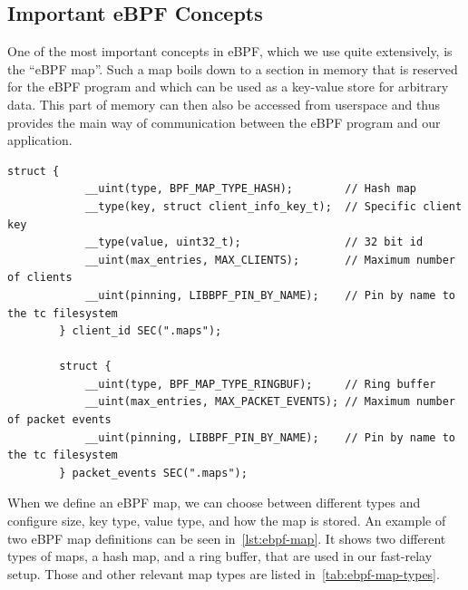 \subsection{Important eBPF Concepts}
One of the most important concepts in eBPF, which we use quite extensively, is 
the ``eBPF map''.
Such a map boils down to a section in memory that is reserved for the eBPF program
and which can be used as a key-value store for arbitrary data.
This part of memory can then also be accessed from userspace and thus provides the main 
way of communication between the eBPF program and our application.


\vspace{0.5cm}
\noindent\begin{minipage}{\textwidth}
    \begin{lstlisting}[style=CStyle,caption={Examplary eBPF map definitions.}, label={lst:ebpf-map}]
        struct {
            __uint(type, BPF_MAP_TYPE_HASH);        // Hash map
            __type(key, struct client_info_key_t);  // Specific client key
            __type(value, uint32_t);                // 32 bit id
            __uint(max_entries, MAX_CLIENTS);       // Maximum number of clients
            __uint(pinning, LIBBPF_PIN_BY_NAME);    // Pin by name to the tc filesystem
        } client_id SEC(".maps");

        struct {
            __uint(type, BPF_MAP_TYPE_RINGBUF);     // Ring buffer
            __uint(max_entries, MAX_PACKET_EVENTS); // Maximum number of packet events
            __uint(pinning, LIBBPF_PIN_BY_NAME);    // Pin by name to the tc filesystem
        } packet_events SEC(".maps");
    \end{lstlisting}
\end{minipage}
\vspace{0.5cm}

When we define an eBPF map, we can choose between different types and configure
size, key type, value type, and how the map is stored. %
An example of two eBPF map definitions can be seen in~\autoref{lst:ebpf-map}.
It shows two different types of maps, a hash map, and a ring buffer, that are used in
our fast-relay setup.
Those and other relevant map types are listed in~\autoref{tab:ebpf-map-types}.


\vspace{0.5cm}

